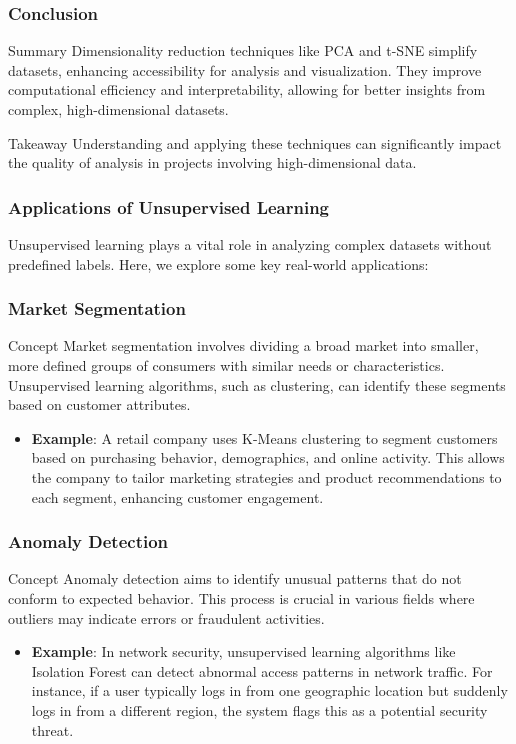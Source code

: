 \documentclass[aspectratio=169]{beamer}
\begin{document}
\begin{frame}[fragile]
    \frametitle{Conclusion}
    \begin{block}{Summary}
        Dimensionality reduction techniques like PCA and t-SNE simplify datasets, enhancing accessibility for analysis and visualization. They improve computational efficiency and interpretability, allowing for better insights from complex, high-dimensional datasets.
    \end{block}

    \begin{block}{Takeaway}
        Understanding and applying these techniques can significantly impact the quality of analysis in projects involving high-dimensional data.
    \end{block}
\end{frame}

\begin{frame}[fragile]
    \frametitle{Applications of Unsupervised Learning}
    Unsupervised learning plays a vital role in analyzing complex datasets without predefined labels. Here, we explore some key real-world applications:
\end{frame}

\begin{frame}[fragile]
    \frametitle{Market Segmentation}
    \begin{block}{Concept}
        Market segmentation involves dividing a broad market into smaller, more defined groups of consumers with similar needs or characteristics. Unsupervised learning algorithms, such as clustering, can identify these segments based on customer attributes.
    \end{block}
    \begin{itemize}
        \item \textbf{Example}: A retail company uses K-Means clustering to segment customers based on purchasing behavior, demographics, and online activity. This allows the company to tailor marketing strategies and product recommendations to each segment, enhancing customer engagement.
    \end{itemize}
\end{frame}

\begin{frame}[fragile]
    \frametitle{Anomaly Detection}
    \begin{block}{Concept}
        Anomaly detection aims to identify unusual patterns that do not conform to expected behavior. This process is crucial in various fields where outliers may indicate errors or fraudulent activities.
    \end{block}
    \begin{itemize}
        \item \textbf{Example}: In network security, unsupervised learning algorithms like Isolation Forest can detect abnormal access patterns in network traffic. For instance, if a user typically logs in from one geographic location but suddenly logs in from a different region, the system flags this as a potential security threat.
    \end{itemize}
\end{frame}
\end{document}
